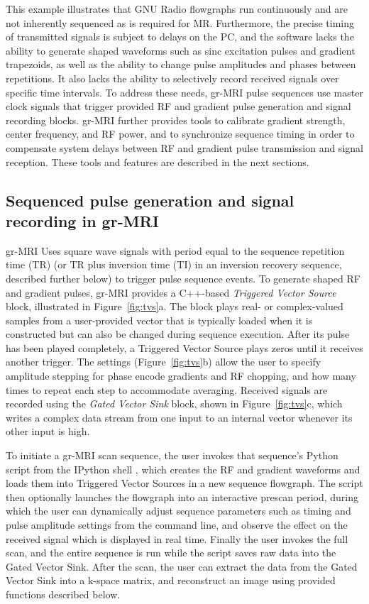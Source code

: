 \documentclass[review]{elsarticle}
\begin{document}
\par This example illustrates that GNU Radio flowgraphs run continuously and are not inherently sequenced
as is required for MR.
Furthermore, the precise timing of transmitted signals is subject to delays on the PC,
and the software lacks the ability to generate shaped waveforms such as sinc excitation pulses and gradient trapezoids,
as well as the ability to change pulse amplitudes and phases between repetitions.  
It also lacks the ability to selectively record received signals over specific time intervals. 
To address these needs, gr-MRI pulse sequences use master clock signals that trigger 
provided RF and gradient pulse generation and signal recording blocks.   
gr-MRI further provides tools to calibrate gradient strength, center frequency, and RF power,
and to synchronize sequence timing in order to compensate system
delays between RF and gradient pulse transmission and signal reception. 
These tools and features are described in the next sections.

\subsection{Sequenced pulse generation and signal recording in gr-MRI}
gr-MRI Uses square wave signals with period equal to the sequence repetition time (TR) 
(or TR plus inversion time (TI) in an inversion recovery sequence, described further below) to trigger pulse sequence events.
To generate shaped RF and gradient pulses, 
gr-MRI provides a C++-based \textit{Triggered Vector Source} block, illustrated in Figure~\ref{fig:tvs}a. 
The block plays real- or complex-valued samples from a user-provided vector that is typically loaded when it is constructed but can also be changed during sequence execution.  
After its pulse has been played completely, 
a Triggered Vector Source plays zeros until it receives another trigger.
The settings (Figure~\ref{fig:tvs}b) allow the user to specify 
amplitude stepping for phase encode gradients and RF chopping, 
and how many times to repeat each step to accommodate averaging.
Received signals are recorded using the \textit{Gated Vector Sink} block, shown in Figure~\ref{fig:tvs}c, 
which writes a complex data stream from one input to an internal vector whenever its other input is high.  

\par To initiate a gr-MRI scan sequence, 
the user invokes that sequence's Python script from the IPython shell \cite{PER-GRA:2007}, which
creates the RF and gradient waveforms and loads
them into Triggered Vector Sources in a new sequence flowgraph.
The script then optionally launches the flowgraph into an interactive prescan period, 
during which the user can dynamically adjust sequence parameters such as timing and pulse amplitude settings from the command line,
and observe the effect on the received signal which is displayed in real time.
Finally the user invokes the full scan,
and the entire sequence is run while the script saves raw data into the Gated Vector Sink.
After the scan, the user can extract the data from the Gated Vector Sink into a k-space matrix,
and reconstruct an image using provided functions described below.
\end{document}
